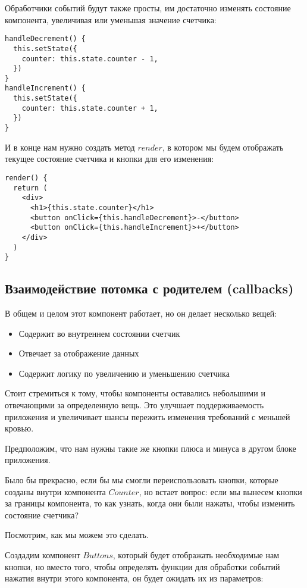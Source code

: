 Обработчики событий будут также просты, им достаточно изменять состояние компонента, увеличивая или уменьшая значение счетчика:

\begin{lstlisting}
handleDecrement() {
  this.setState({
    counter: this.state.counter - 1,
  })
}
handleIncrement() {
  this.setState({
    counter: this.state.counter + 1,
  })
}
\end{lstlisting}

И в конце нам нужно создать метод $render$, в котором мы будем отображать текущее состояние счетчика и кнопки для его изменения:

\begin{lstlisting}
render() {
  return (
    <div>
      <h1>{this.state.counter}</h1>
      <button onClick={this.handleDecrement}>-</button>
      <button onClick={this.handleIncrement}>+</button>
    </div> 
  )
}
\end{lstlisting}

\subsection{Взаимодействие потомка с родителем (callbacks)}

В общем и целом этот компонент работает, но он делает несколько вещей:

\begin{itemize}
  \item Содержит во внутреннем состоянии счетчик
  \item Отвечает за отображение данных
  \item Содержит логику по увеличению и уменьшению счетчика
\end{itemize}

Стоит стремиться к тому, чтобы компоненты оставались небольшими и отвечающими за определенную вещь. Это улучшает поддерживаемость приложения и увеличивает шансы пережить изменения требований с меньшей кровью.

Предположим, что нам нужны такие же кнопки плюса и минуса в другом блоке приложения.

Было бы прекрасно, если бы мы смогли переиспользовать кнопки, которые созданы внутри компонента $Counter$, но встает вопрос: если мы вынесем кнопки за границы компонента, то как узнать, когда они были нажаты, чтобы изменить состояние счетчика?

Посмотрим, как мы можем это сделать.

Создадим компонент $Buttons$, который будет отображать необходимые нам кнопки, но вместо того, чтобы определять функции для обработки событий нажатия внутри этого компонента, он будет ожидать их из параметров:


